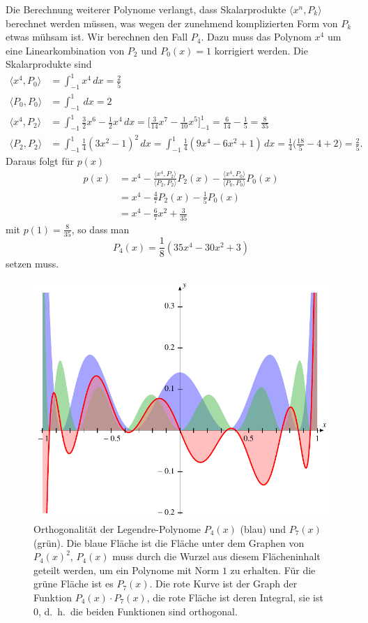 Die Berechnung weiterer Polynome verlangt, dass Skalarprodukte
$\langle x^n,P_k\rangle$ berechnet werden müssen, was wegen
der zunehmend komplizierten Form von $P_k$ etwas mühsam ist.
Wir berechnen den Fall $P_4$.
Dazu muss das Polynom $x^4$ um eine Linearkombination von
$P_2$ und $P_0(x)=1$ korrigiert werden.
Die Skalarprodukte sind
\begin{align*}
\langle x^4, P_0\rangle
&=
\int_{-1}^1 x^4\,dx = \frac25
\\
\langle P_0,P_0\rangle
&=
\int_{-1}^1 \,dx = 2
\\
\langle x^4,P_2\rangle
&=
\int_{-1}^1 \frac32x^6-\frac12 x^4\,dx
=
\biggl[\frac{3}{14}x^7-\frac{1}{10}x^5\biggr]_{-1}^1
=
\frac6{14}-\frac15
=
\frac8{35}
\\
\langle P_2,P_2\rangle
&=
\int_{-1}^1 \frac14(3x^2-1)^2\,dx
=
\int_{-1}^1 \frac14(9x^4-6x^2+1)\,dx
=
\frac14\biggl(\frac{18}{5}-4+2\biggr)
=\frac25.
\end{align*}
Daraus folgt für $p(x)$
\begin{align*}
p(x)
&=
x^4
-
\frac{\langle x^4,P_2\rangle}{\langle P_2,P_2\rangle}P_2(x)
-
\frac{\langle x^4,P_0\rangle}{\langle P_0,P_0\rangle}P_0(x)
\\
&=
x^4
-\frac47 P_2(x) - \frac15 P_0(x)
\\
&=
x^4 - \frac{6}{7}x^2 + \frac{3}{35}
\end{align*}
mit $p(1)=\frac{8}{35}$, so dass man
\[
P_4(x) =
\frac18(35x^4-30x^2+3)
\]
setzen muss.

\begin{figure}
\centering
\includegraphics{chapters/070-orthogonalitaet/images/orthogonal.pdf}
\caption{Orthogonalität der Legendre-Polynome $P_4(x)$ ({\color{blue}blau})
und $P_7(x)$ ({\color{darkgreen}grün}).
Die blaue Fläche ist die Fläche unter dem Graphen 
von $P_4(x)^2$, $P_4(x)$ muss durch die Wurzel aus diesem Flächeninhalt
geteilt werden, um ein Polynome mit Norm $1$ zu erhalten.
Für die grüne Fläche ist es $P_7(x)$.
Die rote Kurve ist der Graph der Funktion $P_4(x)\cdot P_7(x)$,
die rote Fläche ist deren Integral, sie ist $0$, d.~h.~die beiden
Funktionen sind orthogonal.
\label{buch:integral:orthogonal:legendreortho}}
\end{figure}

